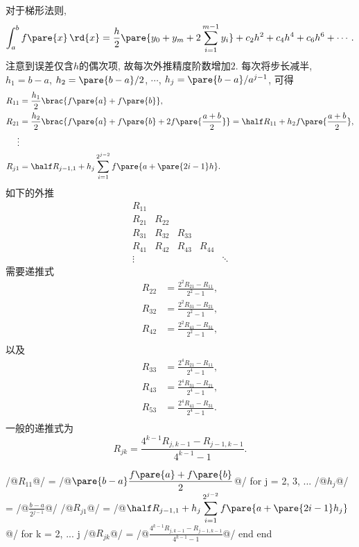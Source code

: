 \documentclass{ctexart}
\begin{document}
对于梯形法则,
\[ \int_a^b f\pare{x}\,\rd{x} = \frac{h}{2}\pare{y_0 + y_m + 2\sum_{i=1}^{m-1}y_i} + c_2h^2 + c_4h^4 + c_6h^6 + \cdots. \]
注意到误差仅含$h$的偶次项, 故每次外推精度阶数增加$2$. 每次将步长减半, $h_1 = b-a$, $h_2 = \pare{b-a}/2$, $\cdots$, $h_j = \pare{b-a}/a^{j-1}$, 可得
\begin{align*}
    R_{11} &= \frac{h_1}{2}\brac{f\pare{a} + f\pare{b}}, \\
    R_{21} &= \frac{h_2}{2}\brac{f\pare{a} + f\pare{b} + 2f\pare{\frac{a+b}{2}}} = \half R_{11} + h_2 f\pare{\frac{a+b}{2}}, \\
    \vdots & \\
    R_{j1} &= \half R_{j-1,1} + h_j \sum_{i=1}^{2^{j-2}} f\pare{a+\pare{2i-1}h}.
\end{align*}
如下的外推
\[ \begin{matrix}
    R_{11} & & & & \\
    R_{21} & R_{22} \\
    R_{31} & R_{32} & R_{33} \\
    R_{41} & R_{42} & R_{43} & R_{44} \\
    \vdots & & & & \ddots
\end{matrix} \]
需要递推式
\begin{align*}
    R_{22} &= \frac{2^2 R_{21} - R_{11}}{2^2-1}, \\
    R_{32} &= \frac{2^2 R_{31} - R_{21}}{2^2-1}, \\
    R_{42} &= \frac{2^2 R_{41} - R_{31}}{2^2-1}, \\
\end{align*}
以及
\begin{align*}
    R_{33} &= \frac{2^4 R_{21} - R_{11}}{2^4-1}, \\
    R_{43} &= \frac{2^4 R_{31} - R_{21}}{2^4-1}, \\
    R_{53} &= \frac{2^4 R_{41} - R_{31}}{2^4-1}. \\
\end{align*}
一般的递推式为
\[ R_{jk} = \frac{4^{k-1}R_{j,k-1} - R_{j-1,k-1}}{4^{k-1}-1}. \]
\begin{matlablst}
/@$R_{11}$@/ = /@$\displaystyle \pare{b-a}\frac{f\pare{a}+f\pare{b}}{2}$@/
for j = 2, 3, ...
    /@$h_j$@/ = /@$\displaystyle \frac{b-a}{2^{j-1}}$@/
    /@$R_{j1}$@/ = /@$\displaystyle \half R_{j-1,1} + h_j \sum_{i=1}^{2^{j-2}} f\pare{a+\pare{2i-1}h_j}$@/
    for k = 2, ... j
        /@$R_{jk}$@/ = /@$\displaystyle \frac{4^{k-1}R_{j,k-1} - R_{j-1,k-1}}{4^{k-1}-1}$@/
    end
end
\end{matlablst}
\end{document}
